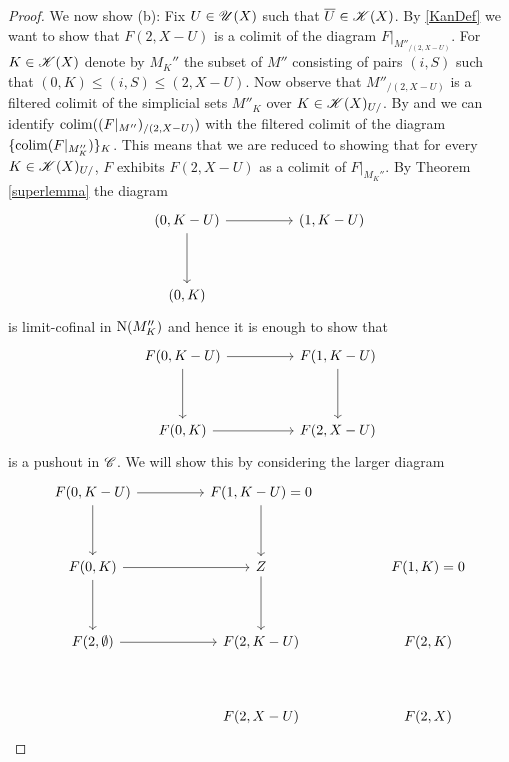 \documentclass[../../thesis.tex]{subfiles}
\begin{document}
\begin{proof}
    We now show (b):
    Fix $U \in \mathscr{U}(X)$ such that $\overline{U} \in \mathscr{K}(X)$. By \ref{KanDef} we want to show that $F(2, X-U)$ is a colimit of the diagram $F|_{M''_{/(2,X-U)}}$.
    For $K \in \mathscr{K}(X)$ denote by $M_K''$ the subset of $M''$ consisting of pairs $(i,S)$ such that $(0,K)\leq (i,S) \leq (2,X-U)$.
    Now observe that $M''_{/(2,X-U)}$ is a filtered colimit of the simplicial sets $M''_K$ over ${K\in \mathscr{K}(X)_{U/}}$.
    By \cite[Remark 4.2.3.9.]{HTT} and \cite[Corollary 4.2.3.10.]{HTT} we can identify $\operatorname*{colim}((F|_{M''})_{/(2,X-U)})$ with the filtered colimit of the diagram $\{\operatorname*{colim}(F|_{M_K''})\}_K$.
    This means that we are reduced to showing that for every $K \in \mathscr{K}(X)_{U/}$, $F$ exhibits $F(2,X-U)$ as a colimit of $F|_{M_K''}$.
    By Theorem \ref{superlemma} the diagram
    \[\begin{tikzcd}
            {(0,K-U)} && {(1,K-U)} \\
            \\
            {(0,K)}
            \arrow[from=1-1, to=1-3]
            \arrow[from=1-1, to=3-1]
        \end{tikzcd}\]
    is limit-cofinal in $\mathrm{N}(M_K'')$ and hence it is enough to show that
    \[\begin{tikzcd}
            {F(0,K-U)} && {F(1,K-U)} \\
            \\
            {F(0,K)} && {F(2,X-U)}
            \arrow[from=1-1, to=1-3]
            \arrow[from=1-1, to=3-1]
            \arrow[from=1-3, to=3-3]
            \arrow[from=3-1, to=3-3]
        \end{tikzcd}\]
    is a pushout in $\mathscr{C}$.
    We will show this by considering the larger diagram
    \[\begin{tikzcd}
            {F(0,K-U)} && {F(1,K-U) = 0} \\
            \\
            {F(0,K)} && Z && {F(1,K) = 0} \\
            \\
            {F(2,\emptyset)} && {F(2,K-U)} && {F(2,K)} \\
            \\
            && {F(2,X-U)} && {F(2,X)}
            \arrow[from=1-1, to=1-3]
            \arrow[from=1-1, to=3-1]
            \arrow[from=1-3, to=3-3]
            \arrow[from=3-1, to=3-3]
            \arrow[from=3-1, to=5-1]
            \arrow[from=5-1, to=5-3]
            \arrow[from=3-3, to=5-3]

\end{tikzcd}\]
\end{proof}
\end{document}
